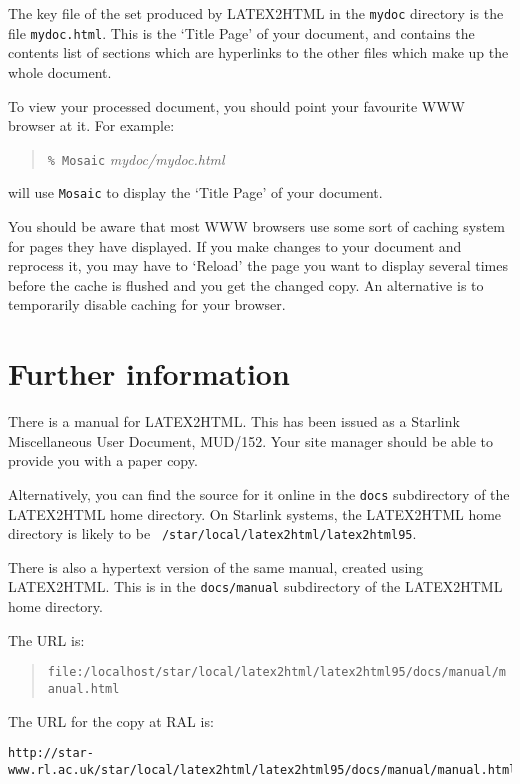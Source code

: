 \documentclass[twoside,11pt]{article}
\newcommand{\htmladdnormallink}[2]{#1}
\newcommand{\xlabel}[1]{}
\begin{document}
The key file of the set produced by LATEX2HTML in the {\tt mydoc}
directory is the file {\tt mydoc.html}.  This is the `Title Page' of
your document, and contains the contents list of sections which are
hyperlinks to the other files which make up the whole document.

To view your processed document, you should point your favourite WWW
browser at it.  For example:

\begin{quote}
{\tt \% Mosaic} {\it mydoc/mydoc.html}
\end{quote}

will use {\tt Mosaic} to display the `Title Page' of your document.

You should be aware that most WWW browsers use some sort of caching
system for pages they have displayed.  If you make changes to your
document and reprocess it, you may have to `Reload' the page you want to
display several times before the cache is flushed and you get the
changed copy.  An alternative is to temporarily disable caching for
your browser.

\section{Further information\xlabel{further_information}}

There is a manual for LATEX2HTML.  This has been issued as a Starlink
Miscellaneous User Document, MUD/152.  Your site manager should be able
to provide you with a paper copy.  

Alternatively, you can find the source for it online in the {\tt docs}
subdirectory of the LATEX2HTML home directory.  On Starlink systems,
the LATEX2HTML home directory is likely to be {\tt
/star/\-local/latex2html/latex2html95}.

There is also a hypertext version of the same manual, created using
LATEX2HTML.  This is in the {\tt docs/manual} subdirectory of the
LATEX2HTML home directory.  

The URL is:

\begin{quote}
{\small
{\tt file:/localhost/star/local/latex2html/latex2html95/docs/manual/manual.html}
}
\end{quote}

The URL for the
\htmladdnormallink{copy at RAL}
{http://star-www.rl.ac.uk/star/local/latex2html/latex2html95/docs/manual/manual.html}
is:

{\small
\begin{verbatim}
http://star-www.rl.ac.uk/star/local/latex2html/latex2html95/docs/manual/manual.html
\end{verbatim}
}
\end{document}
